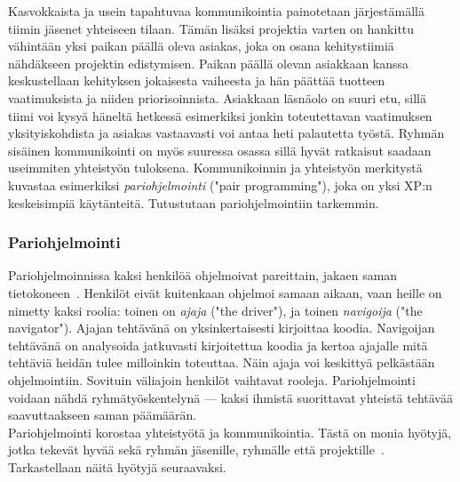 \documentclass[finnish]{../tktltiki2}
\theoremstyle{definition}
\theoremstyle{remark}
\begin{document}
Kasvokkaista ja usein tapahtuvaa kommunikointia painotetaan järjestämällä tiimin jäsenet yhteiseen tilaan. Tämän lisäksi projektia varten on hankittu vähintään yksi paikan päällä oleva asiakas, joka on osana kehitystiimiä nähdäkseen projektin edistymisen. Paikan päällä olevan asiakkaan kanssa keskustellaan kehityksen jokaisesta vaiheesta ja hän päättää tuotteen vaatimuksista ja niiden priorisoinnista. Asiakkaan läsnäolo on suuri etu, sillä tiimi voi kysyä häneltä hetkessä esimerkiksi jonkin toteutettavan vaatimuksen yksityiskohdista ja asiakas vastaavasti voi antaa heti palautetta työstä. Ryhmän sisäinen kommunikointi on myös suuressa osassa sillä hyvät ratkaisut saadaan useimmiten yhteistyön tuloksena. Kommunikoinnin ja yhteistyön merkitystä kuvastaa esimerkiksi \emph{pariohjelmointi} ("pair 
programming"), joka on yksi XP:n keskeisimpiä käytänteitä.
Tutustutaan pariohjelmointiin tarkemmin.

\subsubsection{Pariohjelmointi}

Pariohjelmoinnissa kaksi henkilöä ohjelmoivat pareittain, jakaen saman 
tietokoneen~\cite{Shore:2007:AAD:1407480}. Henkilöt eivät kuitenkaan ohjelmoi samaan aikaan, vaan 
heille on 
nimetty kaksi roolia: toinen on \emph{ajaja} ("the driver"), ja toinen 
\emph{navigoija} ("the navigator"). Ajajan tehtävänä on 
yksinkertaisesti 
kirjoittaa koodia. Navigoijan tehtävänä on analysoida jatkuvasti 
kirjoitettua koodia ja kertoa ajajalle mitä tehtäviä heidän tulee 
milloinkin 
toteuttaa. Näin ajaja voi keskittyä pelkästään ohjelmointiin. Sovituin 
väliajoin henkilöt vaihtavat rooleja. Pariohjelmointi voidaan nähdä 
ryhmätyöskentelynä --- kaksi ihmistä suorittavat yhteistä tehtävää 
saavuttaakseen saman päämäärän.\\

Pariohjelmointi korostaa yhteistyötä ja kommunikointia. Tästä on monia 
hyötyjä, jotka tekevät hyvää sekä ryhmän jäsenille, ryhmälle että 
projektille~\cite{Begel:2008:PPW:1414004.1414026}. Tarkastellaan näitä 
hyötyjä seuraavaksi. 
\end{document}
